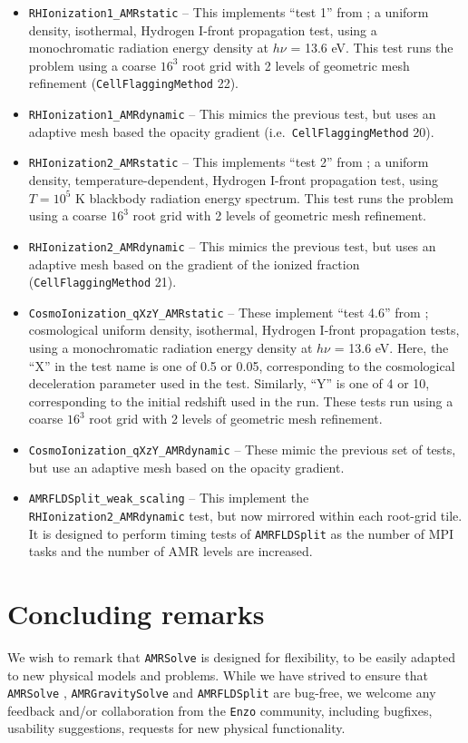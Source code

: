 \documentclass[letterpaper,10pt]{article}
\renewcommand{\(}{\left(}
\renewcommand{\)}{\right)}
\newcommand{\amrsolve}{{\tt AMRSolve} }
\newcommand{\enzo}{{\tt Enzo} }
\begin{document}
\begin{itemize}
\item {\tt RHIonization1\_AMRstatic} -- This implements ``test 1''
  from \cite{IlievEtAl2006}; a uniform density, isothermal, Hydrogen
  I-front propagation test, using a monochromatic radiation energy
  density at $h\nu$ = 13.6 eV.  This test runs the problem using a
  coarse $16^3$ root grid with 2 levels of geometric mesh
  refinement ({\tt CellFlaggingMethod} 22).
\item {\tt RHIonization1\_AMRdynamic} -- This mimics the previous
  test, but uses an adaptive mesh based the opacity gradient
  (i.e.~{\tt CellFlaggingMethod} 20).
\item {\tt RHIonization2\_AMRstatic} -- This implements ``test 2''
  from \cite{IlievEtAl2006}; a uniform density, temperature-dependent,
  Hydrogen I-front propagation test, using $T=10^5$ K blackbody
  radiation energy spectrum.  This test runs the problem using a 
  coarse $16^3$ root grid with 2 levels of geometric mesh
  refinement.
\item {\tt RHIonization2\_AMRdynamic} -- This mimics the previous
  test, but uses an adaptive mesh based on the gradient of the ionized
  fraction ({\tt CellFlaggingMethod} 21).
\item {\tt CosmoIonization\_qXzY\_AMRstatic} -- These implement ``test 
  4.6'' from \cite{ReynoldsHayesPaschosNorman2009}; cosmological
  uniform density, isothermal, Hydrogen I-front propagation tests,
  using a monochromatic radiation energy density at $h\nu$ = 13.6 eV.
  Here, the ``X'' in the test name is one of 0.5 or 0.05,
  corresponding to the cosmological deceleration parameter used in the
  test.  Similarly, ``Y'' is one of 4 or 10, corresponding to the
  initial redshift used in the run.  These tests run using a coarse
  $16^3$ root grid with 2 levels of geometric mesh refinement.
\item {\tt CosmoIonization\_qXzY\_AMRdynamic} -- These mimic the
  previous set of tests, but use an adaptive mesh based on the opacity
  gradient.
\item {\tt AMRFLDSplit\_weak\_scaling} -- This implement the 
  {\tt RHIonization2\_AMRdynamic} test, but now mirrored within each
  root-grid tile.  It is designed to perform timing tests of 
  {\tt AMRFLDSplit} as the number of MPI tasks and the number of AMR
  levels are increased.
\end{itemize}





\section{Concluding remarks}
\label{sec:conclusions}

We wish to remark that \amrsolve is designed for flexibility, to be
easily adapted to new physical models and problems.  While we have
strived to ensure that \amrsolve, {\tt AMRGravitySolve} and 
{\tt AMRFLDSplit} are bug-free, we welcome any feedback and/or
collaboration from the \enzo community, including bugfixes, usability
suggestions, requests for new physical functionality.




\end{document}
